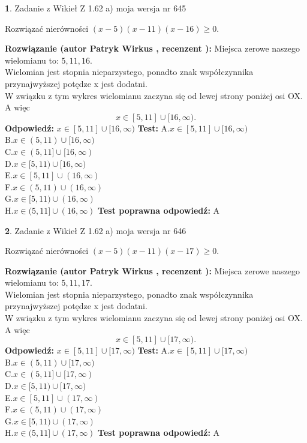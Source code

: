 \documentclass[12pt, a4paper]{article}
\theoremstyle{definition} %
\newtheorem{zad}{}
\newcommand{\zadStart}[1]{\begin{zad}#1\newline}
\newcommand{\zadStop}{\end{zad}}
\newcommand{\rozwStart}[2]{\noindent \textbf{Rozwiązanie (autor #1 , recenzent #2): }\newline}
\newcommand{\rozwStop}{\newline}
\newcommand{\odpStart}{\noindent \textbf{Odpowiedź:}\newline}
\newcommand{\odpStop}{\newline}
\newcommand{\testStart}{\noindent \textbf{Test:}\newline}
\newcommand{\testStop}{\newline}
\newcommand{\kluczStart}{\noindent \textbf{Test poprawna odpowiedź:}\newline}
\newcommand{\kluczStop}{\newline}
\begin{document}
\zadStart{Zadanie z Wikieł Z 1.62 a) moja wersja nr 645}

Rozwiązać nierówności $(x-5)(x-11)(x-16)\ge0$.
\zadStop
\rozwStart{Patryk Wirkus}{}
Miejsca zerowe naszego wielomianu to: $5, 11, 16$.\\
Wielomian jest stopnia nieparzystego, ponadto znak współczynnika przy\linebreak najwyższej potędze x jest dodatni.\\ W związku z tym wykres wielomianu zaczyna się od lewej strony poniżej osi OX. A więc $$x \in [5,11] \cup [16,\infty).$$
\rozwStop
\odpStart
$x \in [5,11] \cup [16,\infty)$
\odpStop
\testStart
A.$x \in [5,11] \cup [16,\infty)$\\
B.$x \in (5,11) \cup [16,\infty)$\\
C.$x \in (5,11] \cup [16,\infty)$\\
D.$x \in [5,11) \cup [16,\infty)$\\
E.$x \in [5,11] \cup (16,\infty)$\\
F.$x \in (5,11) \cup (16,\infty)$\\
G.$x \in [5,11) \cup (16,\infty)$\\
H.$x \in (5,11] \cup (16,\infty)$
\testStop
\kluczStart
A
\kluczStop



\zadStart{Zadanie z Wikieł Z 1.62 a) moja wersja nr 646}

Rozwiązać nierówności $(x-5)(x-11)(x-17)\ge0$.
\zadStop
\rozwStart{Patryk Wirkus}{}
Miejsca zerowe naszego wielomianu to: $5, 11, 17$.\\
Wielomian jest stopnia nieparzystego, ponadto znak współczynnika przy\linebreak najwyższej potędze x jest dodatni.\\ W związku z tym wykres wielomianu zaczyna się od lewej strony poniżej osi OX. A więc $$x \in [5,11] \cup [17,\infty).$$
\rozwStop
\odpStart
$x \in [5,11] \cup [17,\infty)$
\odpStop
\testStart
A.$x \in [5,11] \cup [17,\infty)$\\
B.$x \in (5,11) \cup [17,\infty)$\\
C.$x \in (5,11] \cup [17,\infty)$\\
D.$x \in [5,11) \cup [17,\infty)$\\
E.$x \in [5,11] \cup (17,\infty)$\\
F.$x \in (5,11) \cup (17,\infty)$\\
G.$x \in [5,11) \cup (17,\infty)$\\
H.$x \in (5,11] \cup (17,\infty)$
\testStop
\kluczStart
A
\kluczStop
\end{document}
